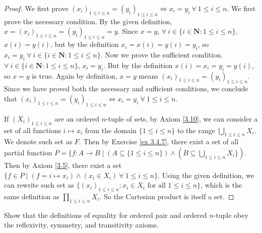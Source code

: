 \begin{proof}
We first prove \((x_i)_{1 \leq i \leq n} = (y_i)_{1 \leq i \leq n} \iff x_i = y_i \ \forall\ 1 \leq i \leq n\).
We first prove the necessary condition.
By the given definition, \(x = (x_i)_{1 \leq i \leq n} = (y_i)_{1 \leq i \leq n} = y\).
Since \(x = y\), \(\forall\ i \in \{i \in \mathbf{N}: 1 \leq i \leq n\}\), \(x(i) = y(i)\), but by the definition \(x_i = x(i) = y(i) = y_i\), so \(x_i = y_i \ \forall\ i \in \{i \in \mathbf{N} : 1 \leq i \leq n\}\).
Now we prove the sufficient condition.
\(\forall\ i \in \{i \in \mathbf{N} : 1 \leq i \leq n\}\), \(x_i = y_i\).
But by the definition \(x(i) = x_i = y_i = y(i)\), so \(x = y\) is true.
Again by definition, \(x = y\) means \((x_i)_{1 \leq i \leq n} = (y_i)_{1 \leq i \leq n}\).
Since we have proved both the necessary and sufficient conditions, we conclude that \((x_i)_{1 \leq i \leq n} = (y_i)_{1 \leq i \leq n} \iff x_i = y_i \ \forall\ 1 \leq i \leq n\).

If \((X_i)_{1 \leq i \leq n}\) are an ordered \(n\)-tuple of sets, by Axiom \ref{3.10}, we can consider a set of all functions \(i \mapsto x_i\) from the domain \(\{1 \leq i \leq n\}\) to the range \(\bigcup_{1 \leq i \leq n} X_i\).
We denote such set as \(F\).
Then by Exercise \ref{ex 3.4.7}, there exist a set of all partial function \(P = \{f : A \to B \mid (A \subseteq \{1 \leq i \leq n\}) \land (B \subseteq \bigcup_{1 \leq i \leq n} X_i\})\).
Then by Axiom \ref{3.5}, there exist a set \(\{f \in P \mid (f = i \mapsto x_i) \land (x_i \in X_i) \ \forall\ 1 \leq i \leq n\}\).
Using the given definition, we can rewrite such set as \(\{(x_i)_{1 \leq i \leq n} : x_i \in X_i \text{ for all } 1 \leq i \leq n\}\), which is the same definition as \(\prod_{1 \leq i \leq n} X_i\).
So the Cartesian product is itself a set.
\end{proof}

\begin{exercise}\label{ex 3.5.3}
Show that the definitions of equality for ordered pair and ordered \(n\)-tuple obey the reflexivity, symmetry, and transitivity axioms.
\end{exercise}

